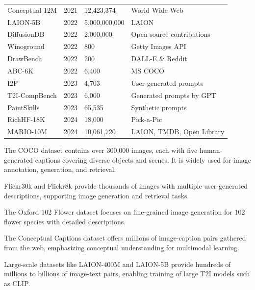 \documentclass[conference]{IEEEtran}
\begin{document}
\begin{table}[h]
{\begin{tabular}{@{}llll@{}}
		Conceptual 12M\cite{changpinyo2021cc12m} & 2021 & 12,423,374 & World Wide Web \\
		LAION-5B\cite{schuhmann2021laion400m} & 2022 & 5,000,000,000 & LAION \\
		DiffusionDB\cite{wang2022diffusiondb} & 2022 & 2,000,000 & Open-source contributions \\
		Winoground\cite{bitton2022winoground} & 2022 & 800 & Getty Images API \\
		DrawBench\cite{saharia2022photorealistic} & 2022 & 200 & DALL-E \& Reddit \\
		ABC-6K\cite{zhang2024abc6k} & 2022 & 6,400 & MS COCO \\
		I2P\cite{schramowski2023safelatentdiffusionmitigating} & 2023 & 4,703 & User generated prompts \\
		T2I-CompBench\cite{huang2023t2icompbench} & 2023 & 6,000 & Generated prompts by GPT \\         PaintSkills\cite{cho2023dallevalprobingreasoningskills} & 2023 & 65,535 & Synthetic prompts \\
		RichHF-18K\cite{liang2023richhf} & 2024 & 18,000 & Pick-a-Pic \\
		MARIO-10M\cite{chen2023textdiffuser} & 2024 & 10,061,720 & LAION, TMDB, Open Library \\
		\hline
	\end{tabular}
}
\end{table}

The COCO dataset \cite{chen2015microsoftcococaptionsdata} contains over 300,000 images, each with five human-generated captions covering diverse objects and scenes. It is widely used for image annotation, generation, and retrieval.

Flickr30k \cite{plummer2016flickr30kentitiescollectingregiontophrase} and Flickr8k \cite{plummer2016flickr30kentitiescollectingregiontophrase} provide thousands of images with multiple user-generated descriptions, supporting image generation and retrieval tasks.

The Oxford 102 Flower dataset \cite{nilsback2008automated} focuses on fine-grained image generation for 102 flower species with detailed descriptions.

The Conceptual Captions dataset \cite{changpinyo2021conceptual12m} offers millions of image-caption pairs gathered from the web, emphasizing conceptual understanding for multimodal learning.

Large-scale datasets like LAION-400M \cite{schuhmann2021laion400m} and LAION-5B \cite{schuhmann2021laion400m} provide hundreds of millions to billions of image-text pairs, enabling training of large T2I models such as CLIP.
\end{document}
